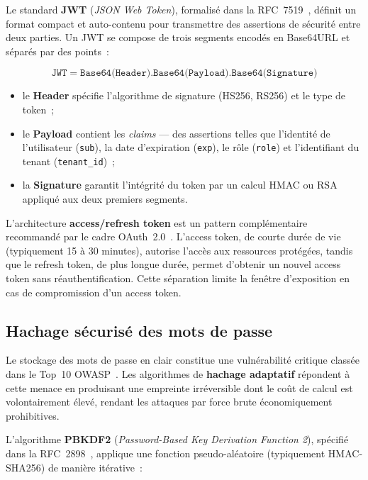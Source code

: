Le standard \textbf{JWT} (\textit{JSON Web Token}), formalisé dans la RFC~7519~\cite{rfc7519}, définit un format compact et auto-contenu pour transmettre des assertions de sécurité entre deux parties. Un JWT se compose de trois segments encodés en Base64URL et séparés par des points~:

\begin{equation}
\texttt{JWT} = \texttt{Base64(Header)}.\texttt{Base64(Payload)}.\texttt{Base64(Signature)}
\end{equation}

\begin{itemize}[noitemsep]
    \item le \textbf{Header} spécifie l'algorithme de signature (HS256, RS256) et le type de token~;
    \item le \textbf{Payload} contient les \textit{claims} --- des assertions telles que l'identité de l'utilisateur (\texttt{sub}), la date d'expiration (\texttt{exp}), le rôle (\texttt{role}) et l'identifiant du tenant (\texttt{tenant\_id})~;
    \item la \textbf{Signature} garantit l'intégrité du token par un calcul HMAC ou RSA appliqué aux deux premiers segments.
\end{itemize}

L'architecture \textbf{access/refresh token} est un pattern complémentaire recommandé par le cadre OAuth~2.0~\cite{oauth2012}. L'access token, de courte durée de vie (typiquement 15 à 30 minutes), autorise l'accès aux ressources protégées, tandis que le refresh token, de plus longue durée, permet d'obtenir un nouvel access token sans réauthentification. Cette séparation limite la fenêtre d'exposition en cas de compromission d'un access token.

\subsection{Hachage sécurisé des mots de passe}

Le stockage des mots de passe en clair constitue une vulnérabilité critique classée dans le Top~10 OWASP~\cite{owasp2021}. Les algorithmes de \textbf{hachage adaptatif} répondent à cette menace en produisant une empreinte irréversible dont le coût de calcul est volontairement élevé, rendant les attaques par force brute économiquement prohibitives.

L'algorithme \textbf{PBKDF2} (\textit{Password-Based Key Derivation Function 2}), spécifié dans la RFC~2898~\cite{rfc2898}, applique une fonction pseudo-aléatoire (typiquement HMAC-SHA256) de manière itérative~:

